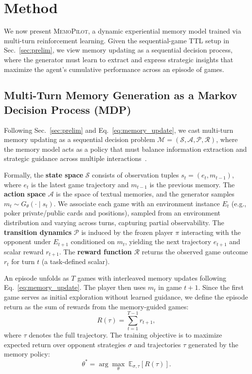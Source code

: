 \documentclass{article}
\newcommand{\methodname}{MemoPilot}
\newcommand{\method}{\textsc{\methodname}}
\theoremstyle{plain}
\theoremstyle{definition}
\theoremstyle{remark}
\begin{document}
\section{Method}
\label{sec:method}

We now present \method{}, a dynamic experiential memory model trained via multi-turn reinforcement learning. Given the sequential-game TTL setup in Sec.~\ref{sec:prelim}, we view memory updating as a sequential decision process, where the generator must learn to extract and express strategic insights that maximize the agent's cumulative performance across an episode of games.

\subsection{Multi-Turn Memory Generation as a Markov Decision Process (MDP)}
\label{sec:multi-turn}

Following Sec.~\ref{sec:prelim} and Eq.~\ref{eq:memory_update}, we cast multi-turn memory updating as a sequential decision problem $\mathcal{M} = (\mathcal{S}, \mathcal{A}, \mathcal{P}, \mathcal{R})$, where the memory model acts as a policy that must balance information extraction and strategic guidance across multiple interactions~\citep{wang2025ragenunderstandingselfevolutionllm}.

Formally, the \textbf{state space} $\mathcal{S}$ consists of observation tuples $s_t = (e_t, m_{t-1})$, where $e_t$ is the latest game trajectory and $m_{t-1}$ is the previous memory. The \textbf{action space} $\mathcal{A}$ is the space of textual memories, and the generator samples $m_t \sim G_\theta(\cdot \mid s_t)$. We associate each game with an environment instance $E_t$ (e.g., poker private/public cards and positions), sampled from an environment distribution and varying across turns, capturing partial observability. The \textbf{transition dynamics} $\mathcal{P}$ is induced by the frozen player $\pi$ interacting with the opponent under $E_{t+1}$ conditioned on $m_t$, yielding the next trajectory $e_{t+1}$ and scalar reward $r_{t+1}$. The \textbf{reward function} $\mathcal{R}$ returns the observed game outcome $r_t$ for turn $t$ (a task-defined scalar).

An episode unfolds as $T$ games with interleaved memory updates following Eq.~\ref{eq:memory_update}. The player then uses $m_t$ in game $t+1$. Since the first game serves as initial exploration without learned guidance, we define the episode return as the sum of rewards from the memory-guided games:
\begin{equation}
R(\tau) = \sum_{t=1}^{T-1} r_{t+1},
\label{eq:episode_return}
\end{equation}
where $\tau$ denotes the full trajectory. The training objective is to maximize expected return over opponent strategies $\sigma$ and trajectories $\tau$ generated by the memory policy:
\begin{equation}
\theta^* = \arg\max_\theta \; \mathbb{E}_{\sigma, \tau} \left[ R(\tau) \right].
\label{eq:objective_mdp}
\end{equation}
\end{document}
